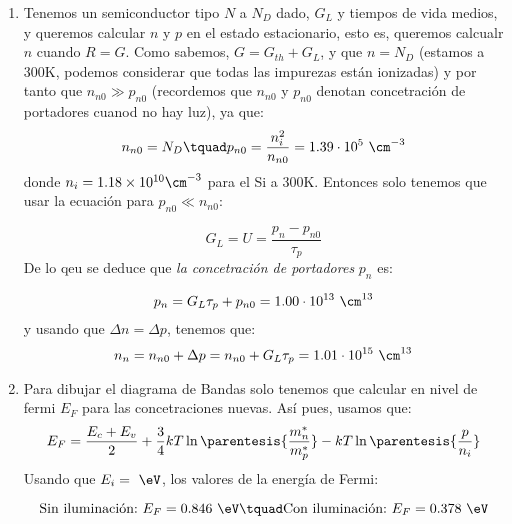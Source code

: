 	\begin{enumerate}[label=\alph*)]
		\item Tenemos un semiconductor tipo $N$ a $N_D$ dado, $G_L$ y tiempos de vida medios, y queremos calcular $n$ y $p$ en el estado estacionario, esto es, queremos calcualr $n$ cuando $R=G$. Como sabemos, $G=G_{th}+G_L$, y que $n=N_D$ (estamos a 300K, podemos considerar que todas las impurezas están ionizadas) y por tanto que $n_{n0}\gg p_{n0}$ (recordemos que $n_{n0}$ y $p_{n0}$ denotan concetración de portadores cuanod no hay luz), ya que:
		\begin{equation}
			n_{n0} = N_D \tquad p_{n0} = \frac{n_i^2}{n_{n0}} = 1.39 \cdot 10^5 \ \cm^{-3}
		\end{equation}
		donde $n_i=1.18\times 10^{10} \cm^{-3}$ para el Si a 300K. Entonces solo tenemos que usar la ecuación para $p_{n0}\ll n_{n0}$:

		\begin{equation}
			G_L = U = \frac{p_n-p_{n0}}{\tau_p}
		\end{equation}
		De lo qeu se deduce que \textit{la concetración de portadores} $p_n$ es:

		\begin{equation}
			p_n = G_L \tau_p + p_{n0} = 1.00 \cdot 10^{13} \ \cm^{13}
		\end{equation}
		y usando que $\Delta n = \Delta p$, tenemos que:
		\begin{equation}
			n_n = n_{n0} + \Delta p  = n_{n0} + G_L\tau_p = 1.01  \cdot 10^{15} \ \cm^{13}
		\end{equation}
		\item Para dibujar el diagrama de Bandas solo tenemos que calcular en nivel de fermi $E_F$ para las concetraciones nuevas. Así pues, usamos que:
		\begin{equation}
			E_F = \frac{E_c+E_v}{2} + \frac{3}{4} kT \ln \parentesis{\frac{m_n^*}{m_p^*}} - kT \ln \parentesis{\frac{p}{n_i}}
		\end{equation}
		Usando que $E_i= \ \eV$, los valores de la energía de Fermi:

		\begin{equation}
			\text{Sin iluminación:} \ E_F = 0.846 \ \eV \tquad
			\text{Con iluminación:} \ E_F = 0.378 \ \eV
		\end{equation}
	\end{enumerate}
